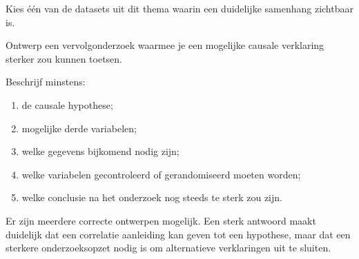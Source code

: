 \documentclass{ximera}
\begin{document}
\begin{oefening}{\oefG}

Kies één van de datasets uit dit thema waarin een duidelijke samenhang
zichtbaar is.

Ontwerp een vervolgonderzoek waarmee je een mogelijke causale verklaring
sterker zou kunnen toetsen.

Beschrijf minstens:

\begin{enumerate}
  \item de causale hypothese;
  \item mogelijke derde variabelen;
  \item welke gegevens bijkomend nodig zijn;
  \item welke variabelen gecontroleerd of gerandomiseerd moeten worden;
  \item welke conclusie na het onderzoek nog steeds te sterk zou zijn.
\end{enumerate}

\begin{oplossing}
Er zijn meerdere correcte ontwerpen mogelijk. Een sterk antwoord maakt
duidelijk dat een correlatie aanleiding kan geven tot een hypothese,
maar dat een sterkere onderzoeksopzet nodig is om alternatieve
verklaringen uit te sluiten.
\end{oplossing}

\end{oefening}
\end{document}
